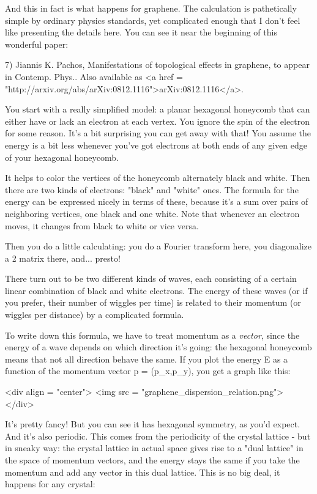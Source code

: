 And this in fact is what happens for graphene.  The calculation is
pathetically simple by ordinary physics standards, yet complicated
enough that I don't feel like presenting the details here.  You 
can see it near the beginning of this wonderful paper:

7) Jiannis K. Pachos, Manifestations of topological effects in
graphene, to appear in Contemp. Phys..  Also available as <a href =
"http://arxiv.org/abs/arXiv:0812.1116">arXiv:0812.1116</a>.

You start with a really simplified model: a planar hexagonal honeycomb
that can either have or lack an electron at each vertex.  You ignore 
the spin of the electron for some reason.  It's a bit surprising you 
can get away with that!  You assume the energy is a bit less whenever 
you've got electrons at both ends of any given edge of your hexagonal 
honeycomb.  

It helps to color the vertices of the honeycomb alternately black and
white.  Then there are two kinds of electrons: "black" and
"white" ones.  The formula for the energy can be expressed
nicely in terms of these, because it's a sum over pairs of neighboring
vertices, one black and one white.  Note that whenever an electron
moves, it changes from black to white or vice versa.

Then you do a little calculating: you do a Fourier transform here,
you diagonalize a 2 matrix there, and... presto!

There turn out to be two different kinds of waves, each consisting of
a certain linear combination of black and white electrons.  The energy of
these waves (or if you prefer, their number of wiggles per time) is
related to their momentum (or wiggles per distance) by a complicated
formula.

To write down this formula, we have to treat momentum as a
\emph{vector}, since the energy of a wave depends on which direction
it's going: the hexagonal honeycomb means that not all direction
behave the same.  If you plot the energy E as a function of the
momentum vector p = (p_{x},p_{y}), you get a graph
like this:

<div align = "center">
<img src = "graphene_dispersion_relation.png">
</div>

It's pretty fancy!  But you can see it has hexagonal symmetry, as you'd
expect.  And it's also periodic.  This comes from the periodicity 
of the crystal lattice - but in sneaky way: the crystal lattice in
actual space gives rise to a "dual lattice" in the space of momentum
vectors, and the energy stays the same if you take the momentum and
add any vector in this dual lattice.  This is no big deal, it happens 
for any crystal:

